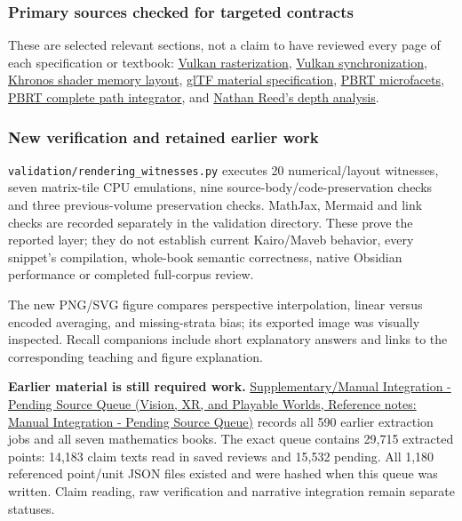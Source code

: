 \subsubsection{Primary sources checked for targeted contracts}\label{appendix-3b67654799a2-primary-sources-checked-for-targeted-contracts}

These are selected relevant sections, not a claim to have reviewed every page of each specification or textbook: \href{https://docs.vulkan.org/spec/latest/chapters/primsrast.html}{Vulkan rasterization}, \href{https://docs.vulkan.org/spec/latest/chapters/synchronization.html}{Vulkan synchronization}, \href{https://docs.vulkan.org/guide/latest/shader_memory_layout.html}{Khronos shader memory layout}, \href{https://raw.githubusercontent.com/KhronosGroup/glTF/main/specification/2.0/Specification.adoc}{glTF material specification}, \href{https://pbr-book.org/4ed/Reflection_Models/Roughness_Using_Microfacet_Theory}{PBRT microfacets}, \href{https://pbr-book.org/4ed/Light_Transport_I_Surface_Reflection/A_Better_Path_Tracer}{PBRT complete path integrator}, and \href{https://developer.nvidia.com/blog/visualizing-depth-precision/}{Nathan Reed's depth analysis}.

\subsubsection{New verification and retained earlier work}\label{appendix-3b67654799a2-new-verification-and-retained-earlier-work}

\texttt{validation/rendering\_witnesses.py} executes 20 numerical/layout witnesses, seven matrix-tile CPU emulations, nine source-body/code-preservation checks and three previous-volume preservation checks. MathJax, Mermaid and link checks are recorded separately in the validation directory. These prove the reported layer; they do not establish current Kairo/Maveb behavior, every snippet's compilation, whole-book semantic correctness, native Obsidian performance or completed full-corpus review.

The new PNG/SVG figure compares perspective interpolation, linear versus encoded averaging, and missing-strata bias; its exported image was visually inspected. Recall companions include short explanatory answers and links to the corresponding teaching and figure explanation.

\textbf{Earlier material is still required work.} \href{../07-Vision-XR-and-Playable-Worlds/main.pdf\#nameddest=appendix-ac1f51db5e9a}{Supplementary/Manual Integration - Pending Source Queue (Vision, XR, and Playable Worlds, Reference notes: Manual Integration - Pending Source Queue)} records all 590 earlier extraction jobs and all seven mathematics books. The exact queue contains 29,715 extracted points: 14,183 claim texts read in saved reviews and 15,532 pending. All 1,180 referenced point/unit JSON files existed and were hashed when this queue was written. Claim reading, raw verification and narrative integration remain separate statuses.

